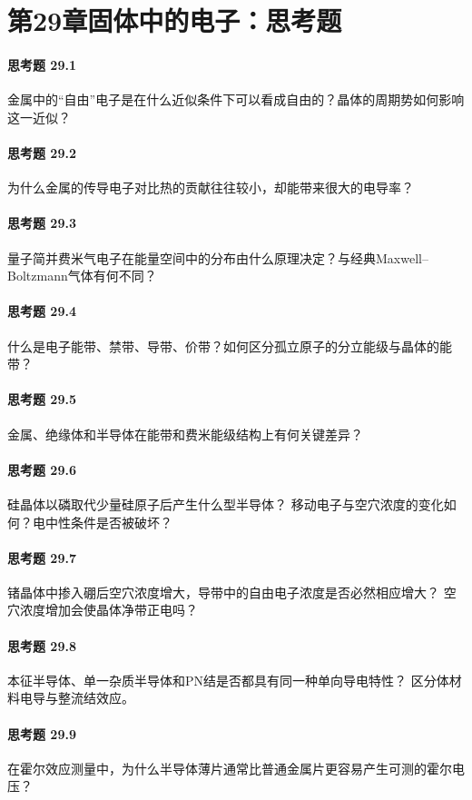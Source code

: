 \section*{第29章\quad 固体中的电子：思考题}
\paragraph{思考题 29.1}
金属中的“自由”电子是在什么近似条件下可以看成自由的？晶体的周期势如何影响这一近似？
\paragraph{思考题 29.2}
为什么金属的传导电子对比热的贡献往往较小，却能带来很大的电导率？
\paragraph{思考题 29.3}
量子简并费米气电子在能量空间中的分布由什么原理决定？与经典Maxwell--Boltzmann气体有何不同？
\paragraph{思考题 29.4}
什么是电子能带、禁带、导带、价带？如何区分孤立原子的分立能级与晶体的能带？
\paragraph{思考题 29.5}
金属、绝缘体和半导体在能带和费米能级结构上有何关键差异？
\paragraph{思考题 29.6}
硅晶体以磷取代少量硅原子后产生什么型半导体？
移动电子与空穴浓度的变化如何？电中性条件是否被破坏？
\paragraph{思考题 29.7}
锗晶体中掺入硼后空穴浓度增大，导带中的自由电子浓度是否必然相应增大？
空穴浓度增加会使晶体净带正电吗？
\paragraph{思考题 29.8}
本征半导体、单一杂质半导体和PN结是否都具有同一种单向导电特性？
区分体材料电导与整流结效应。
\paragraph{思考题 29.9}
在霍尔效应测量中，为什么半导体薄片通常比普通金属片更容易产生可测的霍尔电压？
